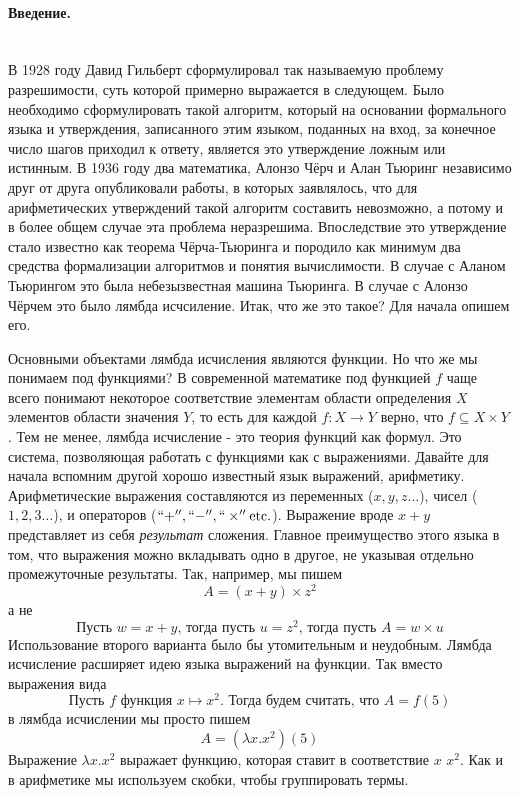\documentclass[lambda.tex]{subfiles}
\begin{document}
\paragraph{Введение.} ~\\

В 1928 году Давид Гильберт сформулировал так называемую проблему разрешимости, суть которой примерно выражается в следующем. Было необходимо сформулировать такой алгоритм, который на основании формального языка и утверждения, записанного этим языком, поданных на вход, за конечное число шагов приходил к ответу, является это утверждение ложным или истинным. В 1936 году два математика, Алонзо Чёрч и Алан Тьюринг независимо друг от друга опубликовали работы, в которых заявлялось, что для арифметических утверждений такой алгоритм составить невозможно, а потому и в более общем случае эта проблема неразрешима. Впоследствие это утверждение стало известно как теорема Чёрча-Тьюринга и породило как минимум два средства формализации алгоритмов и понятия вычислимости. В случае с Аланом Тьюрингом это была небезызвестная машина Тьюринга. В случае с Алонзо Чёрчем это было лямбда исчсиление. Итак, что же это такое? Для начала опишем его.

Основными объектами лямбда исчисления являются функции. Но что же мы понимаем под функциями? В современной математике под функцией $f$ чаще всего понимают некоторое соответствие элементам области определения $X$ элементов области значения $Y$, то есть для каждой $f:X \rightarrow Y$ верно, что $f \subseteq X \times Y$. Тем не менее, лямбда исчисление - это теория функций как формул. Это система, позволяющая работать с функциями как с выражениями.
Давайте для начала вспомним другой хорошо известный язык выражений, арифметику. Арифметические выражения составляются из переменных ($x,y,z\dots$), чисел ($1,2,3\dots$), и операторов ($``+'',``-'',``\times''\text{etc.}$). Выражение вроде $x+y$ представляет из себя \emph{результат} сложения. Главное преимущество этого языка в том, что выражения можно вкладывать одно в другое, не указывая отдельно промежуточные результаты. Так, например, мы пишем
\[A=(x+y) \times z^2\]
а не
\[\text{Пусть }w=x+y\text{, тогда пусть }u=z^2 \text{, тогда пусть }A=w \times u\]
Использование второго варианта было бы утомительным и неудобным.
Лямбда исчисление расширяет идею языка выражений на функции. Так вместо выражения вида
\[\text{Пусть } f \text{ функция } x \mapsto x^2 \text{. Тогда будем считать, что } A=f(5)\]
в лямбда исчислении мы просто пишем
\[A=(\lambda x.x^2)(5)\]
Выражение $\lambda x.x^2$ выражает функцию, которая ставит в соответствие $x$ $x^2$. Как и в арифметике мы используем скобки, чтобы группировать термы.
\end{document}
